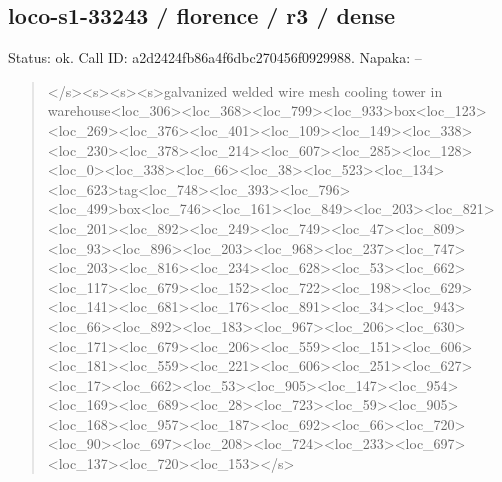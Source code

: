 \documentclass[10pt,a4paper]{article}
\begin{document}
\subsection*{loco-s1-33243 / florence / r3 / dense}
Status: ok. Call ID: a2d2424fb86a4f6dbc270456f0929988. Napaka: --
\begin{quote}\footnotesize
</s>\allowbreak{}<s>\allowbreak{}<s>\allowbreak{}<s>\allowbreak{}galvanized welded wire mesh cooling tower in warehouse<loc\_306>\allowbreak{}<loc\_368>\allowbreak{}<loc\_\allowbreak{}799>\allowbreak{}<loc\_933>\allowbreak{}box<loc\_123>\allowbreak{}<loc\_26\allowbreak{}9>\allowbreak{}<loc\_376>\allowbreak{}<loc\_401>\allowbreak{}<loc\_109>\allowbreak{}<lo\allowbreak{}c\_149>\allowbreak{}<loc\_338>\allowbreak{}<loc\_230>\allowbreak{}<loc\_378\allowbreak{}>\allowbreak{}<loc\_214>\allowbreak{}<loc\_607>\allowbreak{}<loc\_285>\allowbreak{}<loc\allowbreak{}\_128>\allowbreak{}<loc\_0>\allowbreak{}<loc\_338>\allowbreak{}<loc\_66>\allowbreak{}<lo\allowbreak{}c\_38>\allowbreak{}<loc\_523>\allowbreak{}<loc\_134>\allowbreak{}<loc\_623>\allowbreak{}\allowbreak{}tag<loc\_748>\allowbreak{}<loc\_393>\allowbreak{}<loc\_796>\allowbreak{}<l\allowbreak{}oc\_499>\allowbreak{}box<loc\_746>\allowbreak{}<loc\_161>\allowbreak{}<loc\allowbreak{}\_849>\allowbreak{}<loc\_203>\allowbreak{}<loc\_821>\allowbreak{}<loc\_201>\allowbreak{}\allowbreak{}<loc\_892>\allowbreak{}<loc\_249>\allowbreak{}<loc\_749>\allowbreak{}<loc\_\allowbreak{}47>\allowbreak{}<loc\_809>\allowbreak{}<loc\_93>\allowbreak{}<loc\_896>\allowbreak{}<lo\allowbreak{}c\_203>\allowbreak{}<loc\_968>\allowbreak{}<loc\_237>\allowbreak{}<loc\_747\allowbreak{}>\allowbreak{}<loc\_203>\allowbreak{}<loc\_816>\allowbreak{}<loc\_234>\allowbreak{}<loc\allowbreak{}\_628>\allowbreak{}<loc\_53>\allowbreak{}<loc\_662>\allowbreak{}<loc\_117>\allowbreak{}<\allowbreak{}loc\_679>\allowbreak{}<loc\_152>\allowbreak{}<loc\_722>\allowbreak{}<loc\_1\allowbreak{}98>\allowbreak{}<loc\_629>\allowbreak{}<loc\_141>\allowbreak{}<loc\_681>\allowbreak{}<l\allowbreak{}oc\_176>\allowbreak{}<loc\_891>\allowbreak{}<loc\_34>\allowbreak{}<loc\_943\allowbreak{}>\allowbreak{}<loc\_66>\allowbreak{}<loc\_892>\allowbreak{}<loc\_183>\allowbreak{}<loc\_\allowbreak{}967>\allowbreak{}<loc\_206>\allowbreak{}<loc\_630>\allowbreak{}<loc\_171>\allowbreak{}<\allowbreak{}loc\_679>\allowbreak{}<loc\_206>\allowbreak{}<loc\_559>\allowbreak{}<loc\_1\allowbreak{}51>\allowbreak{}<loc\_606>\allowbreak{}<loc\_181>\allowbreak{}<loc\_559>\allowbreak{}<l\allowbreak{}oc\_221>\allowbreak{}<loc\_606>\allowbreak{}<loc\_251>\allowbreak{}<loc\_62\allowbreak{}7>\allowbreak{}<loc\_17>\allowbreak{}<loc\_662>\allowbreak{}<loc\_53>\allowbreak{}<loc\_\allowbreak{}905>\allowbreak{}<loc\_147>\allowbreak{}<loc\_954>\allowbreak{}<loc\_169>\allowbreak{}<\allowbreak{}loc\_689>\allowbreak{}<loc\_28>\allowbreak{}<loc\_723>\allowbreak{}<loc\_59\allowbreak{}>\allowbreak{}<loc\_905>\allowbreak{}<loc\_168>\allowbreak{}<loc\_957>\allowbreak{}<loc\allowbreak{}\_187>\allowbreak{}<loc\_692>\allowbreak{}<loc\_66>\allowbreak{}<loc\_720>\allowbreak{}<\allowbreak{}loc\_90>\allowbreak{}<loc\_697>\allowbreak{}<loc\_208>\allowbreak{}<loc\_72\allowbreak{}4>\allowbreak{}<loc\_233>\allowbreak{}<loc\_697>\allowbreak{}<loc\_137>\allowbreak{}<lo\allowbreak{}c\_720>\allowbreak{}<loc\_153>\allowbreak{}</s>\allowbreak{}

\end{quote}
\end{document}
